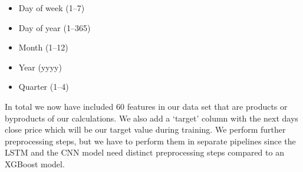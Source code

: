 \documentclass[a4paper,12pt]{report}
\begin{document}
\begin{itemize}
  \item Day of week (1--7)
  \item Day of year (1--365)
  \item Month (1--12)
  \item Year (yyyy)
  \item Quarter (1--4)
\end{itemize}


In total we now have included 60 features in our data set that are products or byproducts of our calculations. We also add a ‘target’ column with the next days close price which will be our target value during training. We perform further preprocessing steps, but we have to perform them in separate pipelines since the LSTM and the CNN model need distinct preprocessing steps compared to an XGBoost model. 


		\subsection{}
\end{document}
